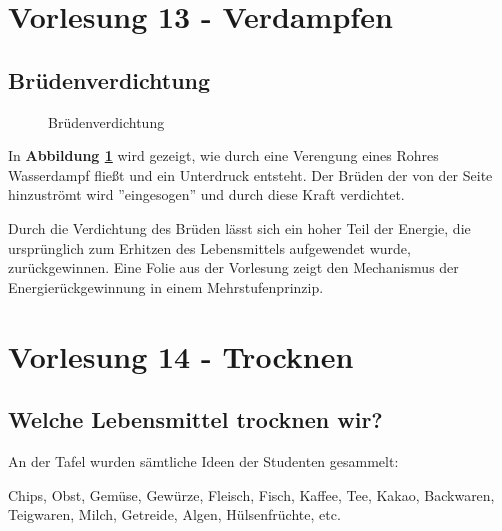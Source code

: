 \documentclass[a4paper,10pt]{article}
\begin{document}
\sidebar
{}
\par \vspace*{5mm}
\section{Vorlesung 13 - Verdampfen}
\subsection{Brüdenverdichtung}
\begin{figure}[h]
\centering

\caption{Brüdenverdichtung}
\label{fig1}
\end{figure}

In \textbf{Abbildung \ref{fig1}} wird gezeigt, wie durch eine Verengung eines Rohres Wasserdampf fließt und ein Unterdruck entsteht. Der Brüden der von der Seite hinzuströmt wird ''eingesogen'' und durch diese Kraft verdichtet.\par
Durch die Verdichtung des Brüden lässt sich ein hoher Teil der Energie, die ursprünglich zum Erhitzen des Lebensmittels aufgewendet wurde, zurückgewinnen. Eine Folie aus der Vorlesung zeigt den Mechanismus der Energierückgewinnung in einem Mehrstufenprinzip.


\section{Vorlesung 14 - Trocknen}
\subsection{Welche Lebensmittel trocknen wir?}
An der Tafel wurden sämtliche Ideen der Studenten gesammelt: \par 
Chips, Obst, Gemüse, Gewürze, Fleisch, Fisch, Kaffee, Tee, Kakao, Backwaren, Teigwaren, Milch, Getreide, Algen, Hülsenfrüchte, etc.
\pp
{}
\end{document}
